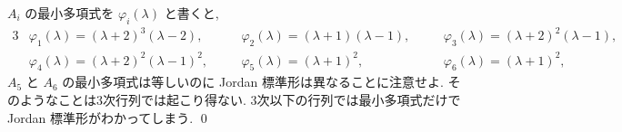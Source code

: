 \documentclass[12pt,twoside]{jarticle}
\begin{document}
{{}$A_i$ の最小多項式を $\varphi_i(\lambda)$ と書くと,
{\small
\begin{alignat*}{3}
  &
  \varphi_1(\lambda) = (\lambda+2)^3(\lambda-2),
  & \quad &
  \varphi_2(\lambda) = (\lambda+1)(\lambda-1),
  & \quad &
  \varphi_3(\lambda) = (\lambda+2)^2(\lambda-1),
  \\ &
  \varphi_4(\lambda) = (\lambda+2)^2(\lambda-1)^2,
  & \quad &
  \varphi_5(\lambda) = (\lambda+1)^2,
  & \quad &
  \varphi_6(\lambda) = (\lambda+1)^2,
\end{alignat*}
}$A_5$ と $A_6$ の最小多項式は等しいのに Jordan 標準形は異なることに注意せよ.
そのようなことは3次行列では起こり得ない. 3次以下の行列では最小多項式だけで 
Jordan 標準形がわかってしまう.
\qed
}


% 
% 
% 
% 
% 

% 
% 
% 
% 
% 

% 
% 
% 
% 
% 

% 
% 
% 
% 
% 

% 
% 
% 
% 
% 

% 
% 
% 
% 
% 
\end{document}
